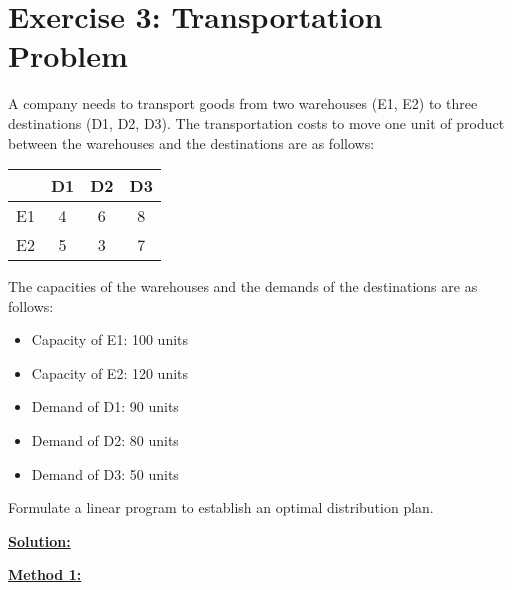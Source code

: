 
\section*{Exercise 3: Transportation Problem}

A company needs to transport goods from two warehouses (E1, E2) to three destinations (D1, D2, D3). The transportation costs
to move one unit of product between the warehouses and the destinations are as follows:

\vspace{0.75cm}
\begin{center}
\begin{tabular}{|c|c|c|c|}
    \hline
    & D1 & D2 & D3 \\
    \hline
    E1 & 4 & 6 & 8\\
    \hline
    E2 & 5 & 3 & 7\\
    \hline
\end{tabular}
\end{center}
\vspace{0.75cm}
The capacities of the warehouses and the demands of the destinations are as follows:

\begin{itemize}
    \item Capacity of E1: 100 units
    \item Capacity of E2: 120 units
    \item Demand of D1: 90 units
    \item Demand of D2: 80 units
    \item Demand of D3: 50 units
\end{itemize}

Formulate a linear program to establish an optimal distribution plan.

\textbf{\underline{\Large Solution:}}

\textbf{\underline{Method 1:}}

